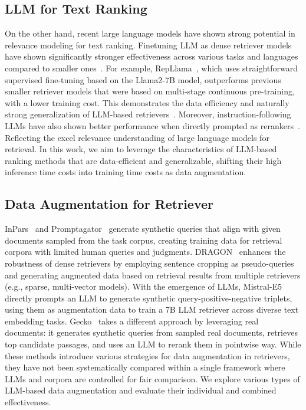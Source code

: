 \documentclass[]{fairmeta}
\begin{document}
\subsection{LLM for Text Ranking}
On the other hand, recent large language models have shown strong potential in relevance modeling for text ranking.
Finetuning LLM as dense retriever models have shown significantly stronger effectiveness across various tasks and languages compared to smaller ones~\citep{wang-etal-2024-improving-text, muennighoff2024generative, springer2024repetition, li2024making}.
For example, RepLlama~\citep{ma2024repllama}, which uses straightforward supervised fine-tuning based on the Llama2-7B model, outperforms previous smaller retriever models that were based on multi-stage continuous pre-training, with a lower training cost.
This demonstrates the data efficiency and naturally strong generalization of LLM-based retrievers~\citep{luo-etal-2024-large}.
Moreover, instruction-following LLMs have also shown better performance when directly prompted as rerankers~\citep{ma2023zeroshot, sun-etal-2023-chatgpt}.
Reflecting the excel relevance understanding of large language models for retrieval.
In this work, we aim to leverage the characteristics of LLM-based ranking methods that are data-efficient and generalizable, shifting their high inference time costs into training time costs as data augmentation.


\subsection{Data Augmentation for Retriever}
InPars~\citep{bonifacio2022inpars} and Promptagator~\citep{promptagator} generate synthetic queries that align with given documents sampled from the task corpus, creating training data for retrieval corpora with limited human queries and judgments.
DRAGON~\citep{lin-etal-2023-train} enhances the robustness of dense retrievers by employing sentence cropping as pseudo-queries and generating augmented data based on retrieval results from multiple retrievers (e.g., sparse, multi-vector models).
With the emergence of LLMs, Mistral-E5~\citep{wang-etal-2024-improving-text} directly prompts an LLM to generate synthetic query-positive-negative triplets, using them as augmentation data to train a 7B LLM retriever across diverse text embedding tasks.
Gecko~\citep{lee2024gecko} takes a different approach by leveraging real documents: it generates synthetic queries from sampled real documents, retrieves top candidate passages, and uses an LLM to rerank them in pointwise way.
While these methods introduce various strategies for data augmentation in retrievers, they have not been systematically compared within a single framework where LLMs and corpora are controlled for fair comparison.
We explore various types of LLM-based data augmentation and evaluate their individual and combined effectiveness.
\end{document}
